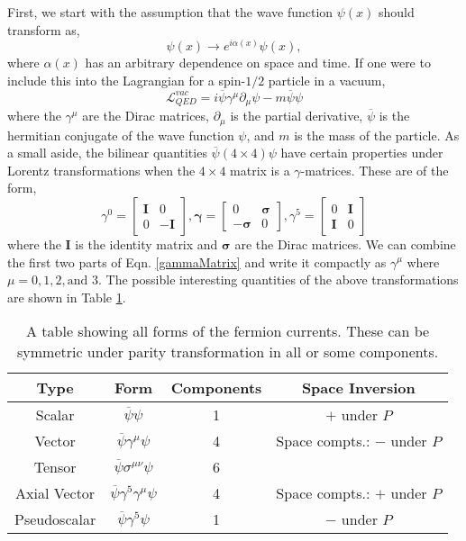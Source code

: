  First, we start with the assumption that the wave function $\psi(x)$ should transform as,
 \begin{equation}\label{U1gauge}
 \psi(x)\rightarrow e^{i\alpha(x)}\psi(x),
 \end{equation}
 where $\alpha(x)$ has an arbitrary dependence on space and time. 
 If one were to include this into the Lagrangian for a spin-$1/2$ particle in a vacuum,
 \begin{equation}\label{DiracLag}
\mathcal{L}_{QED}^{vac}=i\overline{\psi}\gamma^\mu\partial_\mu\psi-m\overline{\psi}\psi
\end{equation}
 where the $\gamma^\mu$ are the Dirac matrices, $\partial_\mu$ is the partial derivative, $\overline{\psi}$ is the hermitian conjugate of the wave function $\psi$, and $m$ is the mass of the particle. As a small aside, the bilinear quantities $\overline{\psi}(4\times4)\psi$ have certain properties under Lorentz transformations when the $4\times4$ matrix is a $\gamma$-matrices. These are of the form,
\begin{equation} \label{gammaMatrix}
\gamma^0=
\begin{bmatrix}
\boldsymbol{I} & 0 \\
0 & -\boldsymbol{I}
\end{bmatrix},
\boldsymbol{\gamma}=
\begin{bmatrix}
0 & \boldsymbol{\sigma} \\
-\boldsymbol{\sigma} & 0
\end{bmatrix},
\gamma^5=
\begin{bmatrix}
0 & \boldsymbol{I} \\
\boldsymbol{I} & 0
\end{bmatrix}
\end{equation}
where the $\boldsymbol{I}$ is the identity matrix and $\boldsymbol{\sigma}$ are the Dirac matrices. We can combine the first two parts of Eqn. \ref{gammaMatrix} and write it compactly as $\gamma^\mu$ where $\mu=0,1,2, \text{and }3$. The possible interesting quantities of the above transformations are shown in Table \ref{Transformations}.

\begin{table}
\centering
\begin{tabular}{|c|c|c|c|}
\hline
Type & Form & Components & Space Inversion \\
\hline
\hline
 Scalar &  $\overline{\psi}\psi$ &  1 & $+$ under $P$ \\
 Vector & $\overline{\psi}\gamma^\mu\psi$ & 4 & Space compts.: $-$ under $P$ \\
 Tensor & $\overline{\psi}\sigma^{\mu\nu}\psi$ & 6 &  \\
 Axial Vector & $\overline{\psi}\gamma^5\gamma^\mu\psi$ & 4 & Space compts.: $+$ under $P$ \\
 Pseudoscalar & $\overline{\psi}\gamma^5\psi$ & 1 & $-$ under $P$ \\
 \hline
\end{tabular}
\caption[Fermion Currents]{A table showing all forms of the fermion currents. These can be symmetric under parity transformation in all or some components.}
\label{Transformations}
\end{table}

